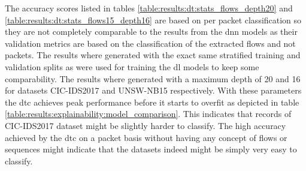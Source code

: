 



The accuracy scores listed in tables \ref{table:results:dt:stats_flows_depth20} and \ref{table:results:dt:stats_flows15_depth16} are based on per packet classification so they are not completely comparable to the results from the \gls{dnn} models as their validation metrics are based on the classification of the extracted flows and not packets. The results where generated with the exact same stratified training and validation splits as were used for training the \gls{dl} models to keep some comparability. The results where generated with a maximum depth of 20 and 16 for datasets CIC-IDS2017 and UNSW-NB15 respectively. With these parameters the \gls{dtc} achieves peak performance before it starts to overfit as depicted in table \ref{table:results:explainability:model_comparison}. This indicates that records of CIC-IDS2017 dataset might be slightly harder to classify. The high accuracy achieved by the \gls{dtc} on a packet basis without having any concept of flows or sequences might indicate that the datasets indeed might be simply very easy to classify. 

